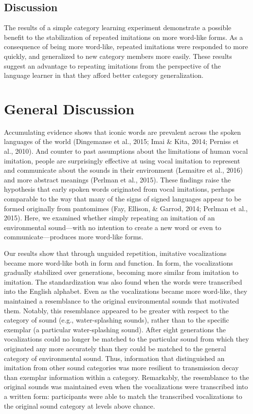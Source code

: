 \documentclass[english,floatsintext,man]{apa6}
\theoremstyle{definition}
\theoremstyle{definition}
\theoremstyle{definition}
\theoremstyle{remark}
\begin{document}
\hypertarget{discussion-2}{%
\subsection{Discussion}\label{discussion-2}}

The results of a simple category learning experiment demonstrate a
possible benefit to the stabilization of repeated imitations on more
word-like forms. As a consequence of being more word-like, repeated
imitations were responded to more quickly, and generalized to new
category members more easily. These results suggest an advantage to
repeating imitations from the perspective of the language learner in
that they afford better category generalization.

\hypertarget{general-discussion}{%
\section{General Discussion}\label{general-discussion}}

Accumulating evidence shows that iconic words are prevalent across the
spoken languages of the world (Dingemanse et al., 2015; Imai \& Kita,
2014; Perniss et al., 2010). And counter to past assumptions about the
limitations of human vocal imitation, people are surprisingly effective
at using vocal imitation to represent and communicate about the sounds
in their environment (Lemaitre et al., 2016) and more abstract meanings
(Perlman et al., 2015). These findings raise the hypothesis that early
spoken words originated from vocal imitations, perhaps comparable to the
way that many of the signs of signed languages appear to be formed
originally from pantomimes (Fay, Ellison, \& Garrod, 2014; Perlman et
al., 2015). Here, we examined whether simply repeating an imitation of
an environmental sound---with no intention to create a new word or even
to communicate---produces more word-like forms.

Our results show that through unguided repetition, imitative
vocalizations became more word-like both in form and function. In form,
the vocalizations gradually stabilized over generations, becoming more
similar from imitation to imitation. The standardization was also found
when the words were transcribed into the English alphabet. Even as the
vocalizations became more word-like, they maintained a resemblance to
the original environmental sounds that motivated them. Notably, this
resemblance appeared to be greater with respect to the category of sound
(e.g., water-splashing sounds), rather than to the specific exemplar (a
particular water-splashing sound). After eight generations the
vocalizations could no longer be matched to the particular sound from
which they originated any more accurately than they could be matched to
the general category of environmental sound. Thus, information that
distinguished an imitation from other sound categories was more
resilient to transmission decay than exemplar information within a
category. Remarkably, the resemblance to the original sounds was
maintained even when the vocalizations were transcribed into a written
form: participants were able to match the transcribed vocalizations to
the original sound category at levels above chance.
\end{document}
